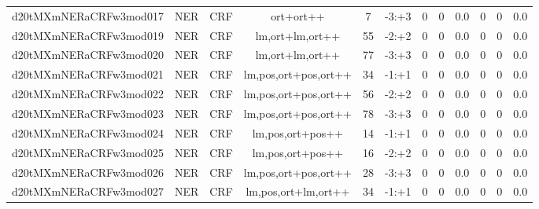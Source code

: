 \documentclass[a4paper]{article}
\begin{document}
\begin{landscape}
\begin{center}
\begin{tabular}{ |c|c|c|c|c|c|c|c|c|c|c|c|}
 
 	
 	\small{ d20tMXmNERaCRFw3mod017 } & \small{ NER} & \small{  CRF }  & ort+ort++  &  7 &  \small{  -3:+3 }  &  0 & 0 & 0.0  &  0 & 0 & 0.0 \\
 	

 
 	
 	\small{ d20tMXmNERaCRFw3mod019 } & \small{ NER} & \small{  CRF }  & lm,ort+lm,ort++  &  55 &  \small{  -2:+2 }  &  0 & 0 & 0.0  &  0 & 0 & 0.0 \\
 	

 
 	
 	\small{ d20tMXmNERaCRFw3mod020 } & \small{ NER} & \small{  CRF }  & lm,ort+lm,ort++  &  77 &  \small{  -3:+3 }  &  0 & 0 & 0.0  &  0 & 0 & 0.0 \\
 	

 
 	
 	\small{ d20tMXmNERaCRFw3mod021 } & \small{ NER} & \small{  CRF }  & lm,pos,ort+pos,ort++  &  34 &  \small{  -1:+1 }  &  0 & 0 & 0.0  &  0 & 0 & 0.0 \\
 	

 
 	
 	\small{ d20tMXmNERaCRFw3mod022 } & \small{ NER} & \small{  CRF }  & lm,pos,ort+pos,ort++  &  56 &  \small{  -2:+2 }  &  0 & 0 & 0.0  &  0 & 0 & 0.0 \\
 	

 
 	
 	\small{ d20tMXmNERaCRFw3mod023 } & \small{ NER} & \small{  CRF }  & lm,pos,ort+pos,ort++  &  78 &  \small{  -3:+3 }  &  0 & 0 & 0.0  &  0 & 0 & 0.0 \\
 	

 
 	
 	\small{ d20tMXmNERaCRFw3mod024 } & \small{ NER} & \small{  CRF }  & lm,pos,ort+pos++  &  14 &  \small{  -1:+1 }  &  0 & 0 & 0.0  &  0 & 0 & 0.0 \\
 	

 
 	
 	\small{ d20tMXmNERaCRFw3mod025 } & \small{ NER} & \small{  CRF }  & lm,pos,ort+pos++  &  16 &  \small{  -2:+2 }  &  0 & 0 & 0.0  &  0 & 0 & 0.0 \\
 	

 
 	
 	\small{ d20tMXmNERaCRFw3mod026 } & \small{ NER} & \small{  CRF }  & lm,pos,ort+pos,ort++  &  28 &  \small{  -3:+3 }  &  0 & 0 & 0.0  &  0 & 0 & 0.0 \\
 	

 
 	
 	\small{ d20tMXmNERaCRFw3mod027 } & \small{ NER} & \small{  CRF }  & lm,pos,ort+lm,ort++  &  34 &  \small{  -1:+1 }  &  0 & 0 & 0.0  &  0 & 0 & 0.0 \\
 	


\end{tabular}
\end{center}
\end{landscape}
\end{document}
